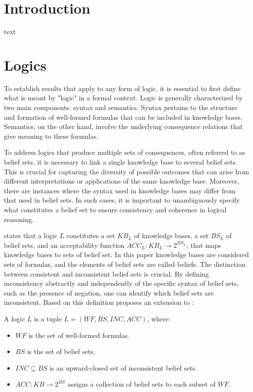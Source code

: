 \section{Introduction}
text

\section{Logics}
To establish results that apply to any form of logic, it is essential to first define what is meant by "logic" in a formal context.
Logic is generally characterized by two main components: syntax and semantics.
Syntax pertains to the structure and formation of well-formed formulas that can be included in knowledge bases.
Semantics, on the other hand, involve the underlying consequence relations that give meaning to these formulas.

To address logics that produce multiple sets of consequences, often referred to as belief sets, it is necessary to link a single knowledge base to several belief sets.
This is crucial for capturing the diversity of possible outcomes that can arise from different interpretations or applications of the same knowledge base.
Moreover, there are instances where the syntax used in knowledge bases may differ from that used in belief sets.
In such cases, it is important to unambiguously specify what constitutes a belief set to ensure consistency and coherence in logical reasoning.

\cite{brewka_equilibria_2007} states that a logic \(L\) constitutes a set \(KB_L\) of knowledge bases, a set \(BS_L\) of belief sets, and an acceptability function \(ACC_L: KB_L \to 2^{BS_L}\), that maps knowledge bases to sets of belief set.
In this paper knowledge bases are considered sets of formulas, and the elements of belief sets are called beliefs.
The distinction between consistent and inconsistent belief sets is crucial.
By defining inconsistency abstractly and independently of the specific syntax of belief sets, such as the presence of negation, one can identify which belief sets are inconsistent.
Based on this definition \cite{brewka_strong_2019} proposes an extension to \cite{brewka_equilibria_2007}:

A logic \(L\) is a tuple \(L = (WF, BS, INC, ACC)\), where:
\begin{itemize}
      \item \(WF\) is the set of well-formed formulas.
      \item \(BS\) is the set of belief sets.
      \item \(INC \subseteq BS\) is an upward-closed set of inconsistent belief sets.
      \item \(ACC: KB \to 2^{BS}\) assigns a collection of belief sets to each subset of \(WF\).
\end{itemize}

